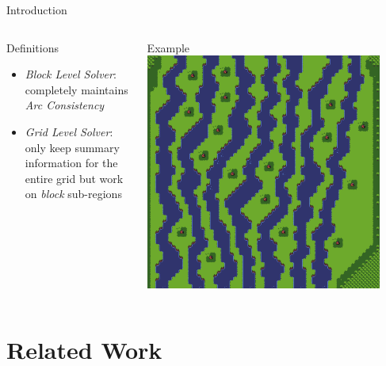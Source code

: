 \documentclass{beamer}
\begin{document}
  \begin{frame}[fragile]{Introduction}
    \begin{columns}[T,onlytextwidth]
        \begin{block}{Definitions}
          \hfill \\
          \begin{itemize}
            \item \textit{Block Level Solver}: \\
              completely maintains \textit{Arc Consistency}
            \item \textit{Grid Level Solver}: \\
              only keep summary information for the entire grid but
              work on \textit{block} sub-regions
          \end{itemize}
        \end{block}
        \begin{block}{Example}
          \includegraphics[width=0.9\textwidth]{img/forestmicro_64x64.pdf}
        \end{block}
    \end{columns}
  \end{frame}


  
  \section{Related Work}
\end{document}

